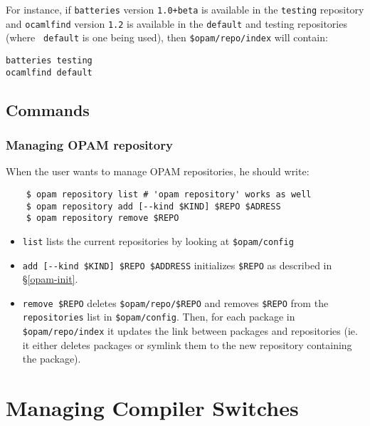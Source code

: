 \documentclass[a4paper,11pt]{article}
\begin{document}
For instance, if {\tt batteries} version {\tt 1.0+beta} is available
in the {\tt testing} repository and {\tt ocamlfind} version {\tt 1.2}
is available in the {\tt default} and testing repositories (where {\tt
  default} is one being used), then \verb+$opam/repo/index+ will
contain:

{\small
\begin{Verbatim}[frame=single]
batteries testing
ocamlfind default
\end{Verbatim}
}

\subsection{Commands}

\subsubsection{Managing OPAM repository}

When the user wants to manage OPAM repositories, he should write:

\begin{verbatim}
    $ opam repository list # 'opam repository' works as well
    $ opam repository add [--kind $KIND] $REPO $ADRESS
    $ opam repository remove $REPO
\end{verbatim}

\begin{itemize}
\item \verb+list+ lists the current repositories by looking at
  \verb+$opam/config+

\item \verb+add [--kind $KIND] $REPO $ADDRESS+ initializes
  \verb+$REPO+ as described in \S\ref{opam-init}.

\item \verb+remove $REPO+ deletes \verb+$opam/repo/$REPO+ and removes
  \verb+$REPO+ from the {\tt repositories} list in \verb+$opam/config+.
  Then, for each package in \verb+$opam/repo/index+ it updates the link
  between packages and repositories (ie. it either deletes packages or
  symlink them to the new repository containing the package).

\end{itemize}

\section{Managing Compiler Switches}
\label{section:switches}
\end{document}
